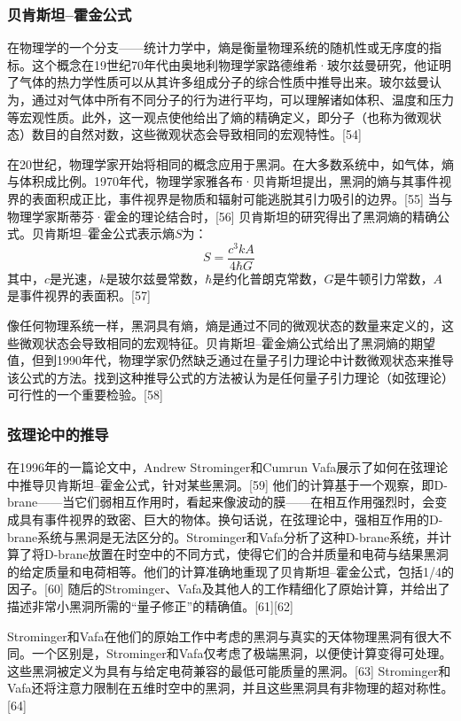 \subsubsection{贝肯斯坦–霍金公式}  
在物理学的一个分支——统计力学中，熵是衡量物理系统的随机性或无序度的指标。这个概念在19世纪70年代由奥地利物理学家路德维希·玻尔兹曼研究，他证明了气体的热力学性质可以从其许多组成分子的综合性质中推导出来。玻尔兹曼认为，通过对气体中所有不同分子的行为进行平均，可以理解诸如体积、温度和压力等宏观性质。此外，这一观点使他给出了熵的精确定义，即分子（也称为微观状态）数目的自然对数，这些微观状态会导致相同的宏观特性。[54]

在20世纪，物理学家开始将相同的概念应用于黑洞。在大多数系统中，如气体，熵与体积成比例。1970年代，物理学家雅各布·贝肯斯坦提出，黑洞的熵与其事件视界的表面积成正比，事件视界是物质和辐射可能逃脱其引力吸引的边界。[55] 当与物理学家斯蒂芬·霍金的理论结合时，[56] 贝肯斯坦的研究得出了黑洞熵的精确公式。贝肯斯坦–霍金公式表示熵\(S\)为：
\[
S = \frac{c^3 k A}{4 \hbar G}~
\]
其中，\(c\)是光速，\(k\)是玻尔兹曼常数，\(\hbar\)是约化普朗克常数，\(G\)是牛顿引力常数，\(A\)是事件视界的表面积。[57]

像任何物理系统一样，黑洞具有熵，熵是通过不同的微观状态的数量来定义的，这些微观状态会导致相同的宏观特征。贝肯斯坦–霍金熵公式给出了黑洞熵的期望值，但到1990年代，物理学家仍然缺乏通过在量子引力理论中计数微观状态来推导该公式的方法。找到这种推导公式的方法被认为是任何量子引力理论（如弦理论）可行性的一个重要检验。[58]
\subsubsection{弦理论中的推导}  
在1996年的一篇论文中，Andrew Strominger和Cumrun Vafa展示了如何在弦理论中推导贝肯斯坦–霍金公式，针对某些黑洞。[59] 他们的计算基于一个观察，即D-brane——当它们弱相互作用时，看起来像波动的膜——在相互作用强烈时，会变成具有事件视界的致密、巨大的物体。换句话说，在弦理论中，强相互作用的D-brane系统与黑洞是无法区分的。Strominger和Vafa分析了这种D-brane系统，并计算了将D-brane放置在时空中的不同方式，使得它们的合并质量和电荷与结果黑洞的给定质量和电荷相等。他们的计算准确地重现了贝肯斯坦–霍金公式，包括1/4的因子。[60] 随后的Strominger、Vafa及其他人的工作精细化了原始计算，并给出了描述非常小黑洞所需的“量子修正”的精确值。[61][62]

Strominger和Vafa在他们的原始工作中考虑的黑洞与真实的天体物理黑洞有很大不同。一个区别是，Strominger和Vafa仅考虑了极端黑洞，以便使计算变得可处理。这些黑洞被定义为具有与给定电荷兼容的最低可能质量的黑洞。[63] Strominger和Vafa还将注意力限制在五维时空中的黑洞，并且这些黑洞具有非物理的超对称性。[64]


